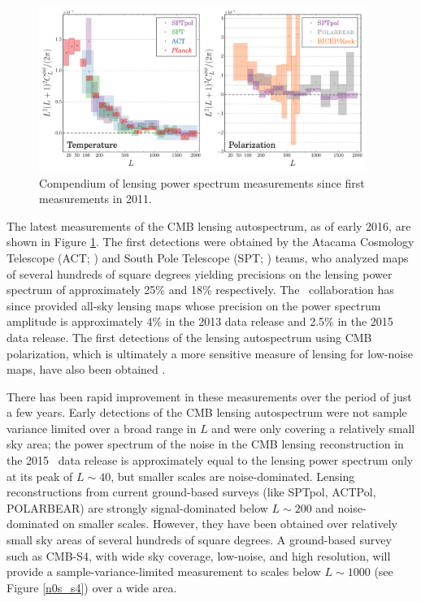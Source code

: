 \begin{figure}[htbp]
\centering
\includegraphics[width=0.95\textwidth]{CMBLensing/autoCompilationTP}
\caption{Compendium of lensing power spectrum measurements since first measurements in 2011.} 
\label{CMBLensPower}
\end{figure}

The latest measurements of the CMB lensing autospectrum, as of early 2016, are shown in Figure \ref{CMBLensPower}. The first detections were obtained by the Atacama Cosmology Telescope (ACT; \cite{Das:2011ak}) and South Pole Telescope  (SPT; \cite{vanEngelen:2012va}) teams, who analyzed maps of several hundreds of square degrees yielding precisions on the lensing power spectrum of approximately 25\% and 18\% respectively.  The \planck\ collaboration has since provided all-sky lensing maps whose precision on the power spectrum amplitude is approximately 4\% in the 2013 data release and 2.5\% in the 2015 data release.  The first detections of the lensing autospectrum using CMB polarization, which is ultimately a more sensitive measure of lensing for low-noise maps,  have also been obtained \cite{Ade:2013gez,Story:2014hni,Array:2016afx}.

There has been rapid improvement in these measurements over the period of just a few years. 
Early detections of the CMB lensing autospectrum were not sample variance limited over a broad range in $L$ and were only covering a relatively small sky area;  
the  power spectrum of the noise in the CMB lensing reconstruction in the 2015 \planck\ data release is approximately equal to the lensing power spectrum only at its peak of $L \sim 40$, but smaller scales are noise-dominated. Lensing reconstructions from current ground-based surveys (like SPTpol, ACTPol, POLARBEAR) 
are strongly signal-dominated below $L \sim 200$ and noise-dominated on smaller scales.  However, they have been obtained over relatively small sky areas of several hundreds of square degrees. A ground-based survey such as CMB-S4, with wide sky coverage, low-noise, and high resolution, will provide a sample-variance-limited measurement to scales below $L \sim 1000$ (see Figure \ref{n0s_s4}) over a wide area.   
 

